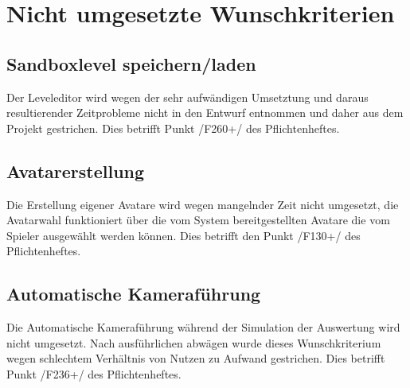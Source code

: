 \chapter{Nicht umgesetzte Wunschkriterien}

\section{Sandboxlevel speichern/laden}
	Der Leveleditor wird wegen der sehr aufwändigen Umsetztung und daraus resultierender Zeitprobleme 
nicht in den Entwurf entnommen und daher aus dem Projekt gestrichen. Dies betrifft Punkt /F260+/ des Pflichtenheftes.  
 
\section{Avatarerstellung}
Die Erstellung eigener Avatare wird wegen mangelnder Zeit nicht umgesetzt, die Avatarwahl funktioniert 
über die vom System bereitgestellten Avatare die vom Spieler ausgewählt werden können. Dies betrifft 
den Punkt /F130+/ des Pflichtenheftes.  

\section{Automatische Kameraführung}
Die Automatische Kameraführung während der Simulation der Auswertung wird nicht umgesetzt. Nach 
ausführlichen abwägen wurde dieses Wunschkriterium wegen schlechtem Verhältnis von Nutzen zu Aufwand 
gestrichen. Dies betrifft Punkt /F236+/ des Pflichtenheftes.  
